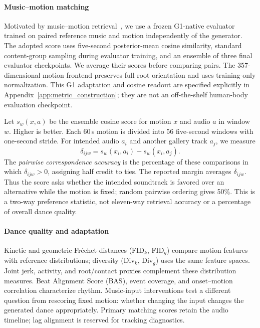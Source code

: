 \paragraph{Music--motion matching}
Motivated by music--motion retrieval~\cite{li2025soulnet}, we use a frozen
G1-native evaluator trained on paired reference music and motion independently
of the generator. The adopted score uses five-second posterior-mean cosine
similarity, standard content-group sampling during evaluator training, and an
ensemble of three final evaluator checkpoints. We average their scores before
comparing pairs. The 357-dimensional motion frontend preserves full root
orientation and uses training-only normalization. This G1 adaptation and cosine
readout are specified explicitly in Appendix~\ref{app:metric_construction};
they are not an off-the-shelf human-body evaluation checkpoint.

Let $s_w(x,a)$ be the ensemble cosine score for motion $x$ and audio $a$ in
window $w$. Higher is better. Each 60\,s motion is divided into 56 five-second
windows with one-second stride. For intended audio $a_i$ and another gallery
track $a_j$, we measure
\begin{equation}
 \delta_{ijw}=s_w(x_i,a_i)-s_w(x_i,a_j).
 \label{eq:mmr_margin}
\end{equation}
The \emph{pairwise correspondence accuracy} is the percentage of these
comparisons in which $\delta_{ijw}>0$, assigning half credit to ties. The
reported margin averages $\delta_{ijw}$. Thus the score asks whether the
intended soundtrack is favored over an alternative while the motion is fixed;
random pairwise ordering gives 50\%. This is a two-way preference statistic,
not eleven-way retrieval accuracy or a percentage of overall dance quality.

\paragraph{Dance quality and adaptation}
Kinetic and geometric Fr\'echet distances (FID$_k$, FID$_g$) compare motion
features with reference distributions; diversity (Div$_k$, Div$_g$) uses the
same feature spaces. Joint jerk, activity, and root/contact proxies complement
these distribution measures. Beat Alignment Score (BAS), event coverage, and
onset--motion correlation characterize rhythm. Music-input interventions test
a different question from rescoring fixed motion: whether changing the input
changes the generated dance appropriately. Primary matching scores retain the
audio timeline; lag alignment is reserved for tracking diagnostics.

